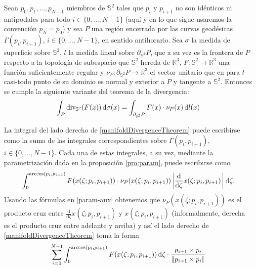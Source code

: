 \documentclass[reqno]{amsart}
\newcommand{\dd}[1][y]{\if#1y\,\fi{\mathrm d}} %
\newcommand{\norm}[2][y]{\if#1y\left\fi\lVert#2\if#1y\right\fi\rVert} %
\newcommand{\abs}[2][y]{\if#1y\left\fi\lvert#2\if#1y\right\fi\rvert} %
\begin{document}
Sean $p_0, p_1, \dotsc, p_{N-1}$ miembros de $\mathbb{S}^2$ tales que $p_i$ y $p_{i+1}$ no son idénticos ni antipodales para todo $i \in \{0, \dotsc, N-1\}$ (aquí y en lo que sigue usaremos la convención $p_N = p_0$) y sea $P$ una región encerrada por las curvas geodésicas $\Gamma(p_i, p_{i+1})$, $i \in \{0, \dotsc, N-1\}$, en sentido antihorario.
Sea $\sigma$ la medida de superficie sobre $\mathbb{S}^2$, $l$ la medida lineal sobre $\partial_{\mathbb{S}^2} P$, que a su vez es la frontera de $P$ respecto a la topología de subespacio que $\mathbb{S}^2$ hereda de $\mathbb{R}^3$, $F \colon \mathbb{S}^2 \to \mathbb{R}^3$ una función suficientemente regular y $\nu_P \colon \partial_{\mathbb{S}^2} P \to \mathbb{R}^3$ el vector unitario que en para $l$-casi-todo punto de su dominio es normal y exterior a $P$ y tangente a $\mathbb{S}^2$.
Entonces se cumple la siguiente variante del teorema de la divergencia:
%
\begin{equation}\label{manifoldDivergenceTheorem}
\int_P \operatorname{div}_{\mathbb{S}^2}(F(x)) \dd\sigma(x)
= \int_{\partial_{\mathbb{S}^2} P} F(x) \cdot \nu_P(x) \dd l(x)
\end{equation}
%

La integral del lado derecho de \eqref{manifoldDivergenceTheorem} puede escribirse como la suma de las integrales correspondientes sobre $\Gamma(p_i, p_{i+1})$, $i \in \{0, \dotsc, N-1\}$.
Cada una de estas integrales, a su vez, mediante la parametrización dada en la proposición \ref{pro:param}, puede escribirse como
%
\begin{equation*}
\int_0^{\arccos(p_i, p_{i+1})} F(x(\zeta;p_i,p_{i+1})) \cdot \nu_P(x(\zeta;p_i,p_{i+1})) \abs{\frac{\mathrm{d}}{\mathrm{d}\zeta} x(\zeta;p_i,p_{i+1})} \dd \zeta.
\end{equation*}
%
Usando las fórmulas en \eqref{param-aux} obtenemos que $\nu_P(x(\zeta;p_i,p_{i+1}))$ es el producto cruz entre $\frac{\mathrm{d}}{\mathrm{d}\zeta} x(\zeta;p_i,p_{i+1})$ y $x(\zeta;p_i,p_{i+1})$ (informalmente, derecha es el producto cruz entre adelante y arriba) y así el lado derecho de \eqref{manifoldDivergenceTheorem} toma la forma
%
\begin{equation*}
\sum_{i=0}^{N-1} \int_0^{\arccos(p_i,p_{i+1})} F(x(\zeta;p_i,p_{i+1})) \dd \zeta \cdot \frac{p_{i+1} \times p_i}{\norm{p_{i+1} \times p_i}}
\end{equation*}
%
\end{document}
